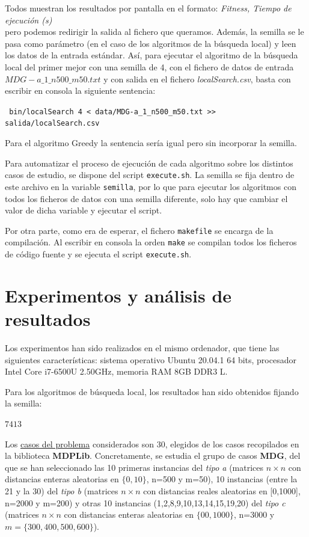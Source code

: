 \documentclass[11pt,a4paper]{article}
\begin{document}
	Todos muestran los resultados por pantalla en el formato: \textit{Fitness, Tiempo de ejecución (s)}\\ pero podemos redirigir la salida al fichero que queramos. Además, la semilla se le pasa como parámetro (en el caso de los algoritmos de la búsqueda local) y leen los datos  de la entrada estándar. Así, para ejecutar el algoritmo de la búsqueda local del primer mejor con una semilla de 4, con el fichero de datos de entrada $MDG-a\_1\_n500\_m50.txt$ y con salida en el fichero \textit{localSearch.csv}, basta con escribir en consola la siguiente sentencia:
	
	 \lstinline| bin/localSearch 4 < data/MDG-a_1_n500_m50.txt >> salida/localSearch.csv|
	
	Para el algoritmo Greedy la sentencia sería igual pero sin incorporar la semilla. 
	
	Para automatizar el proceso de ejecución de cada algoritmo sobre los distintos casos de estudio, se dispone del script \lstinline|execute.sh|. La semilla se fija dentro de este archivo en la variable \lstinline|semilla|, por lo que para ejecutar los algoritmos con todos los ficheros de datos con una semilla diferente, solo hay que cambiar el valor de dicha variable y ejecutar el script. 
	
	Por otra parte, como era de esperar, el fichero \lstinline|makefile| se encarga de la compilación. Al escribir en consola la orden \lstinline|make| se compilan todos los ficheros de código fuente y se ejecuta el script \lstinline|execute.sh|. 
	
\newpage
	
	\section{Experimentos y análisis de resultados}
	
	Los experimentos han sido realizados en el mismo ordenador, que tiene las siguientes características: sistema operativo Ubuntu 20.04.1 64 bits, procesador Intel Core i7-6500U 2.50GHz, memoria RAM 8GB DDR3 L.
	
	Para los algoritmos de búsqueda local, los resultados han sido obtenidos fijando la semilla:
	\vspace{-5mm} \begin{center}{ $ 7413 $}\end{center}
 \vspace{-4mm}
	
	Los \underline{casos del problema} considerados son 30, elegidos de los casos recopilados en la biblioteca \textbf{MDPLib}. Concretamente, se estudia el grupo de casos \textbf{MDG}, del que se han seleccionado las 10 primeras instancias del \textit{tipo a} (matrices $n\times n$ con distancias enteras aleatorias en $ \{0,10\} $, n=500 y m=50), 10 instancias (entre la 21 y la 30) del \textit{tipo b} (matrices $n\times n$ con distancias reales aleatorias en [0,1000], n=2000 y m=200) y otras 10 instancias (1,2,8,9,10,13,14,15,19,20) del \textit{tipo c} (matrices $n\times n$ con distancias enteras aleatorias en $ \{00,1000\} $, n=3000 y\\ $ m=\{300,400,500,600\} $).
	
\end{document}
